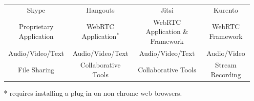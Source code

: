 \documentclass[compress]{beamer}
\begin{document}
\begin{frame}[c]
\begin{table}[]
\begin{tabular}{cccc}
Skype & Hangouts & Jitsi & Kurento   \\
\tiny Proprietary Application & \tiny WebRTC Application$^{*}$ & \tiny WebRTC Application \& Framework & \tiny WebRTC Framework  \\
\tiny Audio/Video/Text & \tiny Audio/Video/Text & \tiny Audio/Video/Text & \tiny Audio/Video  \\
\tiny File Sharing & \tiny Collaborative Tools & \tiny Collaborative Tools & \tiny Stream Recording 
\end{tabular}
\end{table}

	\tiny{* requires installing a plug-in on non chrome web browsers.}
		\end{frame}




\end{document}
